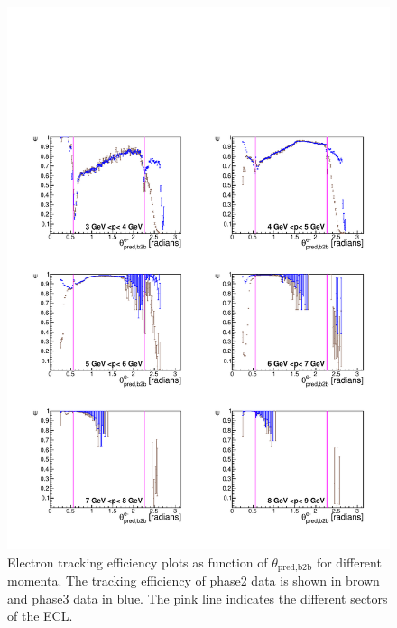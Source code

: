 \documentclass[a4paper,11pt,twosided,final,german,openbib,pdftex,listof=totoc,bibliography=totoc]{scrbook}
\begin{document}
\begin{figure}[!htbp]
	\centering
	\includegraphics[width=\textwidth]{Plots/comp/cMThetaem_Data.pdf}
	\caption[Momentum $\theta_{\textrm{pred,b2b}}$ Electron Efficiency]{Electron tracking efficiency plots as function of $\theta_{\textrm{pred,b2b}}$ for different momenta. The tracking efficiency of phase2 data is shown in brown and phase3 data in blue. The pink line indicates the different sectors of the ECL.}
	\label{plt:compThetaem}
\end{figure}
\end{document}

